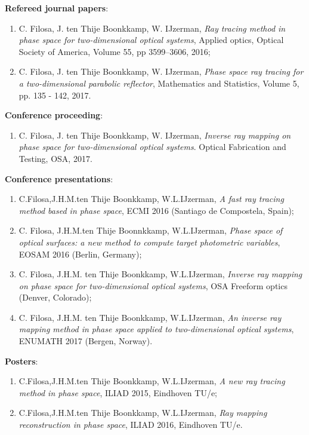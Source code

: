 \documentclass[letterpaper,10pt]{article}
\begin{document}
\noindent \textbf{Refereed journal papers}:
\begin{enumerate}
\item   C. Filosa, J. ten Thije Boonkkamp, W. IJzerman,
\emph{Ray tracing method in phase space for two-dimensional optical systems}, Applied optics, Optical Society of America,
  Volume 55, pp 3599--3606, 2016;

\item  C. Filosa, J. ten Thije Boonkkamp, W. IJzerman, 
  \emph{Phase space ray tracing for a two-dimensional parabolic reflector},
Mathematics and Statistics, Volume 5, pp. 135 - 142, 2017.
\end{enumerate}
\noindent \textbf{Conference proceeding}:
\begin{enumerate}
\item 
  C. Filosa, J. ten Thije Boonkkamp, W. IJzerman,  \emph{Inverse ray mapping on phase space for two-dimensional optical systems}.
  Optical Fabrication and Testing, OSA, 2017. 
\end{enumerate}
\noindent \textbf{Conference presentations}:
\begin{enumerate}
\item C.Filosa,J.H.M.ten Thije Boonkkamp, W.L.IJzerman, \emph{A fast ray tracing method based in phase space}, ECMI 2016 (Santiago de Compostela, Spain);
\item C. Filosa, J.H.M.ten Thije Boonnkkamp, W.L.IJzerman, \emph{Phase space of optical surfaces: a new method to compute target photometric variables}, EOSAM 2016 (Berlin, Germany);
\item C. Filosa, J.H.M. ten Thije Boonkkamp, W.L.IJzerman, \emph{Inverse ray mapping on phase space for two-dimensional optical systems}, OSA Freeform optics (Denver, Colorado);
\item C. Filosa, J.H.M. ten Thije Boonkkamp, W.L.IJzerman, \emph{An inverse ray mapping method in phase space applied to two-dimensional optical systems}, ENUMATH 2017 (Bergen, Norway).
\end{enumerate}

\noindent \textbf{Posters}:
\begin{enumerate}
\item  C.Filosa,J.H.M.ten Thije Boonkkamp, W.L.IJzerman, \emph{A new ray tracing method in phase space}, ILIAD 2015, Eindhoven TU/e;
\item  C.Filosa,J.H.M.ten Thije Boonkkamp, W.L.IJzerman, \emph{Ray mapping reconstruction in phase space}, ILIAD 2016, Eindhoven TU/e.
\end{enumerate}
\end{document}
